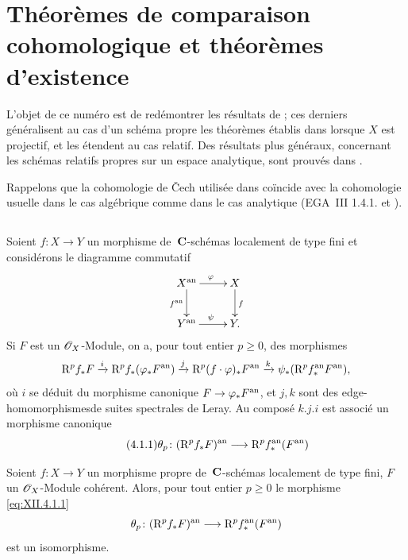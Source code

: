 \section[Th\'eor\`emes de comparaison cohomologique]{Th\'eor\`emes de comparaison cohomologique et th\'eor\`emes d'existence}
\label{XII.4}

L'objet de ce num\'ero est de red\'emontrer les r\'esultats de
\cite[ th.\, 5 et th.\, 6]{XII.3}; ces derniers g\'en\'eralisent au cas
d'un sch\'ema propre les th\'eor\`emes \'etablis dans \cite[]{XII.10} lorsque $X$ est projectif, et les \'etendent au cas
relatif. Des r\'esultats plus g\'en\'eraux, concernant les
sch\'emas relatifs propres sur un espace analytique, sont
prouv\'es dans \cite[ch.\, VIII ]{XII.7}.

Rappelons que la cohomologie de {\v{C}}ech utilis\'ee dans \cite[]{XII.10} co\"incide avec la cohomologie usuelle dans le cas
alg\'ebrique comme dans le cas analytique (EGA~III 1.4.1. et \cite[II 5.10]{XII.5}).
\subsection{}
\label{XII.4.1}
Soient $f \colon X \to Y $ un morphisme de~$\mathbf{C}$-sch\'emas
localement de type fini et consid\'erons le diagramme commutatif
$$
\xymatrix{{X^\an}\ar[r]^\varphi\ar[d]_{f^\an}&{X}\ar[d]^f\\{Y^\an}\ar[r]^\psi&{Y \quoi.}}
$$
Si $F$ est un $\cal{O}_X$-Module, on a, pour tout entier $p \geq
0$, des morphismes
$$
\mathrm{R}^p f_* F \xrightarrow{i} \mathrm{R}^p f_* (\varphi_* F^{\mathrm{an}} )
\xrightarrow{j} \mathrm{R}^p (f\cdot\varphi)_* F^{\mathrm{an}} \xrightarrow{k} \psi_*
(\mathrm{R}^p f_*^{\mathrm{an}} F^{\mathrm{an}} ) ,
$$
o\`u $i$ se d\'eduit du morphisme canonique $F \to \varphi_*
F^\an $, et $j, k$ sont des \og edge-homomorphismes\fg de suites
spectrales de Leray. Au compos\'e $k.j.i$ est associ\'e un
morphisme canonique
\begin{equation*}
\label{eq:XII.4.1.1}
\tag{4.1.1} {\theta_p \colon (\R^p f_* F)^\an \to \R^p f_*^\an
(F^\an )}
\end{equation*}

\begin{theoreme}
\label{XII.4.2}
Soient
$f \colon X \to Y $ un morphisme propre de~$\mathbf{C}$-sch\'emas
localement de type fini, $F$ un $\cal{O}_X$-Module
coh\'erent. Alors, pour tout entier $p \geq 0$ le morphisme
\eqref{eq:XII.4.1.1}
$$
\theta_p \colon (\R^p f_* F)^\an \to \R^p f_*^\an (F^\an)
$$
est un isomorphisme.
\end{theoreme}

